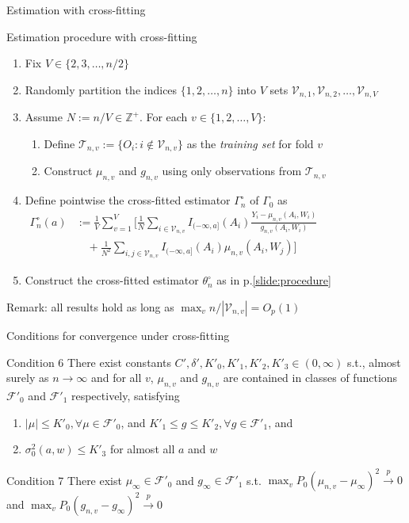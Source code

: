 \documentclass{beamer}
\newcommand{\f}[2]{\frac{#1}{#2}}
\newcommand{\Z}{\mathbb{Z}}
\begin{document}
\begin{frame}{Estimation with cross-fitting}
  \begin{block}{Estimation procedure with cross-fitting}
    \begin{enumerate}
      \item Fix $V \in \{ 2,3,\dots,n/2 \}$
      \item Randomly partition the indices $\{ 1,2,\dots,n \}$ into $V$ sets $\mathcal{V}_{n,1},\mathcal{V}_{n,2},\dots,\mathcal{V}_{n,V}$
      \item Assume $N := n/V \in \Z^+$. For each $v \in \{ 1,2,\dots,V \}$:
      \begin{enumerate}
        \item Define $\mathcal{T}_{n,v} := \{ O_i: i\notin \mathcal{V}_{n,v} \}$ as the \textit{training set} for fold $v$
        \item Construct $\mu_{n,v}$ and $g_{n,v}$ using only observations from $\mathcal{T}_{n,v}$
      \end{enumerate}
      \item Define pointwise the cross-fitted estimator $\Gamma_n^\circ$ of $\Gamma_0$ as
      $\begin{aligned}
        \textstyle \Gamma_n^\circ(a) &:= \textstyle \f{1}{V} \sum_{v=1}^V \Big[ \f{1}{N} \sum_{i \in \mathcal{V}_{n,v}} I_{(-\infty,a]}(A_i) \f{Y_i -\mu_{n,v}(A_i,W_i)}{g_{n,v}(A_i,W_i)} \\
        &\quad \textstyle + \f{1}{N^2} \sum_{i,j \in \mathcal{V}_{n,v}} I_{(-\infty,a]}(A_i) \mu_{n,v}(A_i,W_j) \Big]
      \end{aligned}$
      \item Construct the cross-fitted estimator $\theta_n^\circ$ as in p.\ref{slide:procedure}
    \end{enumerate}
  \end{block}
  Remark: all results hold as long as $\max_v n/|\mathcal{V}_{n,v}| = O_p(1)$
\end{frame}

\begin{frame}{Conditions for convergence under cross-fitting}
  \begin{block}{Condition 6}
    There exist constants $C',\delta',K'_0,K'_1,K'_2,K'_3 \in (0,\infty)$ s.t., almost surely as $n \rightarrow \infty$ and for all $v$, $\mu_{n,v}$ and $g_{n,v}$ are contained in classes of functions $\mathcal{F}'_0$ and $\mathcal{F}'_1$ respectively, satisfying
    \begin{enumerate}
      \item $|\mu| \le K'_0, \forall \mu \in \mathcal{F}'_0$, and $K'_1 \le g \le K'_2, \forall g \in \mathcal{F}'_1$, and
      \item $\sigma_0^2(a,w) \le K'_3$ for almost all $a$ and $w$
    \end{enumerate}
  \end{block}
  \begin{block}{Condition 7}
    There exist $\mu_\infty \in \mathcal{F}'_0$ and $g_\infty \in \mathcal{F}'_1$ s.t. $\max_v P_0(\mu_{n,v} -\mu_\infty)^2 \stackrel{p}{\rightarrow} 0$ and $\max_v P_0(g_{n,v} -g_\infty)^2 \stackrel{p}{\rightarrow} 0$
  \end{block}
\end{frame}
\end{document}
